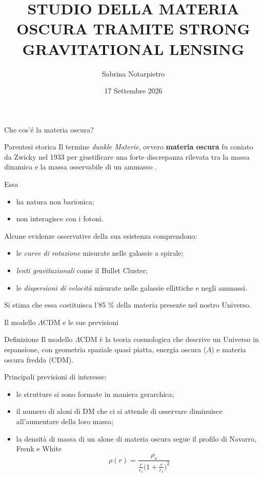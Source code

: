 \documentclass[aspectratio=169]{beamer}
\title[Studio della DM tramite SGL]{STUDIO DELLA MATERIA OSCURA TRAMITE STRONG GRAVITATIONAL LENSING}
\author{Sabrina Notarpietro}
\institute{\small{ Alma Mater Studiorum Università di Bologna} \\ \large
Dipartimento di Fisica e Astronomia "Augusto Righi"}
\date{17 Settembre 2026}
\begin{document}
\begin{frame}[plain]
    \titlepage
\end{frame}

\begin{frame}{Che cos'é la materia oscura?}
    \begin{block}{Parentesi storica}
        Il termine \emph{dunkle Materie}, ovvero \textbf{materia oscura} fu coniato da Zwicky nel 1933 per giustificare una forte discrepanza rilevata tra la massa dinamica e la massa osservabile di un ammasso \parencite{Zwicky1933}.
    \end{block}
    Essa
    \begin{itemize}
        \item ha natura non barionica;
        \item non interagisce con i fotoni.
    \end{itemize}
    Alcune evidenze osservative della sua esistenza comprendono:
    \begin{itemize}
        \item le \emph{curve di rotazione} misurate nelle galassie a spirale;
        \item \emph{lenti gravitazionali} come il Bullet Cluster;
        \item le \emph{dispersioni di velocità} misurate nelle galassie ellittiche e negli ammassi.
    \end{itemize}
    Si stima che essa costituisca l'85 \% della materia presente nel nostro Universo.
\end{frame}

\begin{frame}{Il modello $\Lambda$CDM e le sue previsioni}
    \begin{block}{Definizione}
        Il modello $\Lambda$CDM è la teoria cosmologica che descrive un Universo in espansione, con geometria spaziale quasi piatta, energia oscura ($\Lambda$) e materia oscura fredda (CDM).
    \end{block}
    Principali previsioni di interesse:
    \begin{itemize}
        \item le strutture si sono formate in maniera gerarchica;
        \item il numero di aloni di DM che ci si attende di osservare diminuisce all'aumentare della loro massa;
        \item la densità di massa di un alone di materia oscura segue il profilo di Navarro, Frenk e White \parencite{NavarroFrenk1996}
              \begin{equation*}
                  \rho(r)=\frac{\rho_s}{\frac{r}{r_s}\Big(1+\frac{r}{r_s}\Big)^2}
                  \label{eq:NFW}
              \end{equation*}
    \end{itemize}
\end{frame}
\end{document}
